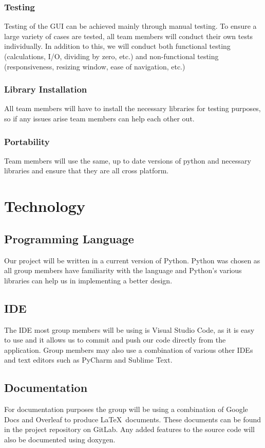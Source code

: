 \documentclass{article}
\begin{document}
\subsubsection{Testing}
Testing of the GUI can be achieved mainly through manual testing. To ensure a large variety of cases are tested, all team members will conduct their own tests individually. In addition to this, we will conduct both functional testing (calculations, I/O, dividing by zero, etc.) and non-functional testing (responsiveness, resizing window, ease of navigation, etc.)   

\subsubsection{Library Installation}
All team members will have to install the necessary libraries for testing purposes, so if any issues arise team members can help each other out.

\subsubsection{Portability}
Team members will use the same, up to date versions of python and necessary libraries and ensure that they are all cross platform.

\section{Technology}
\subsection{Programming Language}
Our project will be written in a current version of Python. Python was chosen as all group members have familiarity with the language and Python’s various libraries can help us in implementing a better design.
\subsection{IDE}
The IDE most group members will be using is Visual Studio Code, as it is easy to use and it allows us to commit and push our code directly from the application. Group members may also use a combination of various other IDEs and text editors such as PyCharm and Sublime Text.
\subsection{Documentation}
For documentation purposes the group will be using a combination of Google Docs and Overleaf to produce \LaTeX\ documents. These documents can be found in the project repository on GitLab. Any added features to the source code will also be documented using doxygen.
\end{document}
